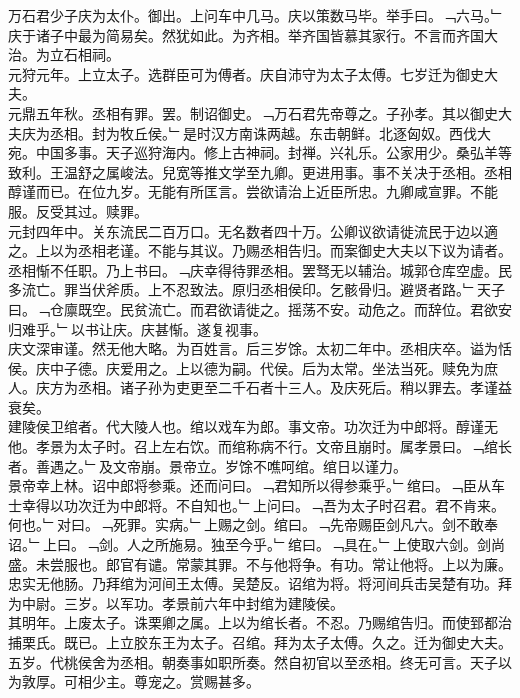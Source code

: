 \documentclass{zhvt-classic}
\begin{document}
\hspace*{2em}万石君少子庆为太仆。御出。上问车中几马。庆以策数马毕。举手曰。﹁六马。﹂庆于诸子中最为简易矣。然犹如此。为齐相。举齐国皆慕其家行。不言而齐国大治。为立石相祠。\\
\hspace*{2em}元狩元年。上立太子。选群臣可为傅者。庆自沛守为太子太傅。七岁迁为御史大夫。\\
\hspace*{2em}元鼎五年秋。丞相有罪。罢。制诏御史。﹁万石君先帝尊之。子孙孝。其以御史大夫庆为丞相。封为牧丘侯。﹂是时汉方南诛两越。东击朝鲜。北逐匈奴。西伐大宛。中国多事。天子巡狩海内。修上古神祠。封禅。兴礼乐。公家用少。桑弘羊等致利。王温舒之属峻法。兒宽等推文学至九卿。更进用事。事不关决于丞相。丞相醇谨而已。在位九岁。无能有所匡言。尝欲请治上近臣所忠。九卿咸宣罪。不能服。反受其过。赎罪。\\
\hspace*{2em}元封四年中。关东流民二百万口。无名数者四十万。公卿议欲请徙流民于边以適之。上以为丞相老谨。不能与其议。乃赐丞相告归。而案御史大夫以下议为请者。丞相惭不任职。乃上书曰。﹁庆幸得待罪丞相。罢驽无以辅治。城郭仓库空虚。民多流亡。罪当伏斧质。上不忍致法。原归丞相侯印。乞骸骨归。避贤者路。﹂天子曰。﹁仓廪既空。民贫流亡。而君欲请徙之。摇荡不安。动危之。而辞位。君欲安归难乎。﹂以书让庆。庆甚惭。遂复视事。\\
\hspace*{2em}庆文深审谨。然无他大略。为百姓言。后三岁馀。太初二年中。丞相庆卒。谥为恬侯。庆中子德。庆爱用之。上以德为嗣。代侯。后为太常。坐法当死。赎免为庶人。庆方为丞相。诸子孙为吏更至二千石者十三人。及庆死后。稍以罪去。孝谨益衰矣。\\
\hspace*{2em}建陵侯卫绾者。代大陵人也。绾以戏车为郎。事文帝。功次迁为中郎将。醇谨无他。孝景为太子时。召上左右饮。而绾称病不行。文帝且崩时。属孝景曰。﹁绾长者。善遇之。﹂及文帝崩。景帝立。岁馀不噍呵绾。绾日以谨力。\\
\hspace*{2em}景帝幸上林。诏中郎将参乘。还而问曰。﹁君知所以得参乘乎。﹂绾曰。﹁臣从车士幸得以功次迁为中郎将。不自知也。﹂上问曰。﹁吾为太子时召君。君不肯来。何也。﹂对曰。﹁死罪。实病。﹂上赐之剑。绾曰。﹁先帝赐臣剑凡六。剑不敢奉诏。﹂上曰。﹁剑。人之所施易。独至今乎。﹂绾曰。﹁具在。﹂上使取六剑。剑尚盛。未尝服也。郎官有谴。常蒙其罪。不与他将争。有功。常让他将。上以为廉。忠实无他肠。乃拜绾为河间王太傅。吴楚反。诏绾为将。将河间兵击吴楚有功。拜为中尉。三岁。以军功。孝景前六年中封绾为建陵侯。\\
\hspace*{2em}其明年。上废太子。诛栗卿之属。上以为绾长者。不忍。乃赐绾告归。而使郅都治捕栗氏。既已。上立胶东王为太子。召绾。拜为太子太傅。久之。迁为御史大夫。五岁。代桃侯舍为丞相。朝奏事如职所奏。然自初官以至丞相。终无可言。天子以为敦厚。可相少主。尊宠之。赏赐甚多。\\
\end{document}

